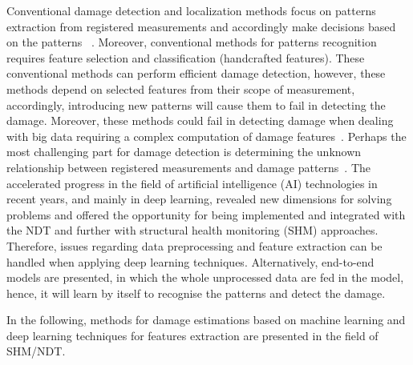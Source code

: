 \documentclass[preprint,9pt]{elsarticle}
\begin{document}
    Conventional damage detection and localization methods focus on patterns extraction from registered measurements and accordingly make decisions based on the patterns ~\cite{Gul2009}. 
    Moreover, conventional methods for patterns recognition requires feature selection and classification (handcrafted features). 
	These conventional methods can perform efficient damage detection, however, these methods depend on selected features from their scope of measurement, accordingly, introducing new patterns will cause them to fail in detecting the damage.
	Moreover, these methods could fail in detecting damage when dealing with big data requiring a complex computation of damage features~\cite{Gulgec2019}.
    Perhaps the most challenging part for damage detection is determining the unknown relationship between registered measurements and damage patterns~\cite{Gulgec2019}. 
    The accelerated progress in the field of artificial intelligence (AI) technologies in recent years, and mainly in deep learning, 
    revealed new dimensions for solving problems and offered the opportunity for being implemented and integrated with the NDT and further with structural health monitoring (SHM) approaches.
    Therefore, issues regarding data preprocessing and feature extraction can be handled when applying deep learning techniques. 
    Alternatively, end-to-end models are presented, in which the whole unprocessed data are fed in the model, hence, it will learn by itself to recognise the patterns and detect the damage.
    
  	In the following, methods for damage estimations based on machine learning and deep learning techniques for features extraction are presented in the field of SHM/NDT.
  	
\end{document}
